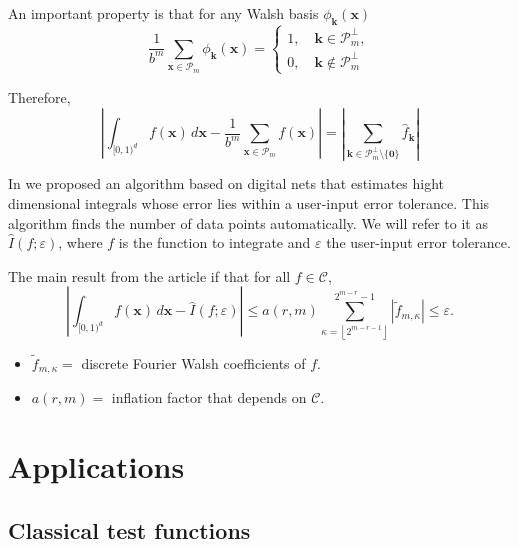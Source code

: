 \documentclass[]{elsarticle}
\theoremstyle{definition}
\newcommand{\cube}{[0,1)^d}
\newcommand{\bvec}[1]{\boldsymbol{#1}}
\newcommand{\vx}{\bvec{x}}
\newcommand{\vk}{\bvec{k}}
\newcommand{\hf}{\hat{f}}
\newcommand{\tf}{\tilde{f}}
\newcommand{\vzero}{\bvec{0}}
\def\abs#1{\ensuremath{\left \lvert #1 \right \rvert}}
\begin{document}
An important property is that for any Walsh basis $\phi_{\vk}(\vx)$
\[
\frac{1}{b^m}\sum_{\vx\in\mathcal{P}_m}\phi_{\vk}(\vx)=
\begin{cases}
1,\quad \vk\in\mathcal{P}_m^\perp, \\
0,\quad \vk\notin\mathcal{P}_m^\perp
\end{cases}
\]

Therefore,
\[
\abs{\int_{\cube} f(\vx)\,d\vx - \frac{1}{b^m}\sum_{\vx\in\mathcal{P}_m}f(\vx)}=\abs{\sum_{\vk\in\mathcal{P}_m^\perp\setminus\{\vzero\}}\hf_{\vk}}
\]

In \cite{HicJim} we proposed an algorithm based on digital nets that estimates hight dimensional integrals whose error lies within a user-input error tolerance. This algorithm finds the number of data points automatically. We will refer to it as $\widehat{I}(f;\varepsilon)$, where $f$ is the function to integrate and $\varepsilon$ the user-input error tolerance.

The main result from the article if that for all $f\in\mathcal{C}$,
\[
\abs{\int_{\cube} f(\vx)\,d\vx - \widehat{I}(f;\varepsilon)}\leq a(r,m)\sum_{\kappa=\left \lfloor 2^{m-r-1}\right \rfloor}^{2^{m-r}-1} \abs{\tf_{m,\kappa}}\leq \varepsilon.
\]
\begin{itemize}
\item $\tf_{m,\kappa}=$ discrete Fourier Walsh coefficients of $f$.
\item $a(r,m)=$ inflation factor that depends on $\mathcal{C}$.
\end{itemize}




\section{Applications}
\label{appli}
\subsection{Classical test functions}
\end{document}
